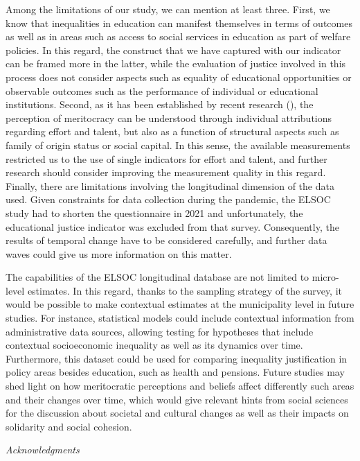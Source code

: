 \documentclass[
  12pt,
  a4paper,
]{article}
\begin{document}
Among the limitations of our study, we can mention at least three. First, we know that inequalities in education can manifest themselves in terms of outcomes as well as in areas such as access to social services in education as part of welfare policies. In this regard, the construct that we have captured with our indicator can be framed more in the latter, while the evaluation of justice involved in this process does not consider aspects such as equality of educational opportunities or observable outcomes such as the performance of individual or educational institutions. Second, as it has been established by recent research (), the perception of meritocracy can be understood through individual attributions regarding effort and talent, but also as a function of structural aspects such as family of origin status or social capital. In this sense, the available measurements restricted us to the use of single indicators for effort and talent, and further research should consider improving the measurement quality in this regard. Finally, there are limitations involving the longitudinal dimension of the data used. Given constraints for data collection during the pandemic, the ELSOC study had to shorten the questionnaire in 2021 and unfortunately, the educational justice indicator was excluded from that survey. Consequently, the results of temporal change have to be considered carefully, and further data waves could give us more information on this matter.

The capabilities of the ELSOC longitudinal database are not limited to micro-level estimates. In this regard, thanks to the sampling strategy of the survey, it would be possible to make contextual estimates at the municipality level in future studies. For instance, statistical models could include contextual information from administrative data sources, allowing testing for hypotheses that include contextual socioeconomic inequality as well as its dynamics over time. Furthermore, this dataset could be used for comparing inequality justification in policy areas besides education, such as health and pensions. Future studies may shed light on how meritocratic perceptions and beliefs affect differently such areas and their changes over time, which would give relevant hints from social sciences for the discussion about societal and cultural changes as well as their impacts on solidarity and social cohesion.

\pagebreak

\emph{Acknowledgments}
\end{document}
